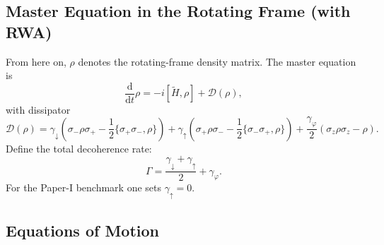\subsection{Master Equation in the Rotating Frame (with RWA)}

From here on, \(\rho\) denotes the rotating-frame density matrix.
The master equation is
\begin{equation}
	\frac{\mathrm{d}}{\mathrm{d}t}\rho = -i[\tilde{H}, \rho] + \mathcal{D}(\rho),
	\label{eq:MasterEquationRotatingFrame}
\end{equation}
with dissipator
\begin{equation}
	\mathcal{D}(\rho) =
	\gamma_{\downarrow}\left(\sigma_-\rho\sigma_+ - \frac{1}{2}\{\sigma_+\sigma_-, \rho\}\right)
	+ \gamma_{\uparrow}\left(\sigma_+\rho\sigma_- - \frac{1}{2}\{\sigma_-\sigma_+, \rho\}\right)
	+ \frac{\gamma_\varphi}{2}\left(\sigma_z \rho \sigma_z - \rho\right).
	\label{eq:DissipatorOperator}
\end{equation}
Define the total decoherence rate:
\begin{equation}
	\Gamma = \frac{\gamma_{\downarrow} + \gamma_{\uparrow}}{2} + \gamma_\varphi.
	\label{eq:TotalDecoherenceRate}
\end{equation}
For the Paper-I benchmark one sets \(\gamma_{\uparrow} = 0\).

\subsection{Equations of Motion}

